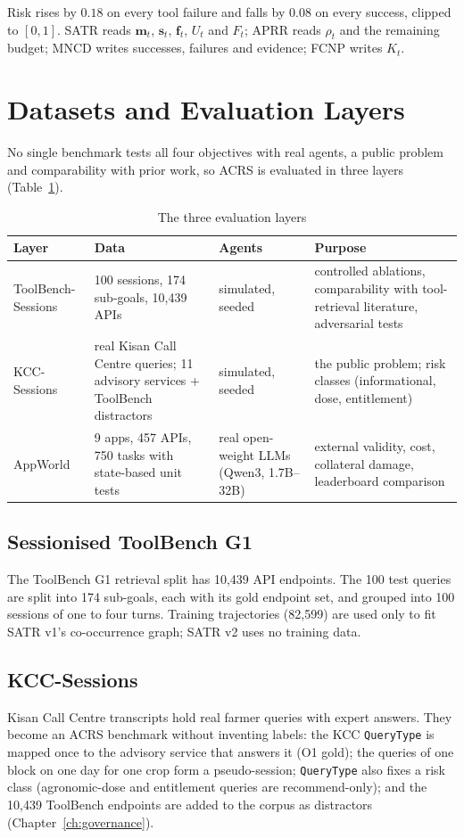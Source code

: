 Risk rises by $0.18$ on every tool failure and falls by $0.08$ on every success, clipped to $[0,1]$. SATR
reads $\mathbf{m}_t$, $\mathbf{s}_t$, $\mathbf{f}_t$, $U_t$ and $F_t$; APRR reads $\rho_t$ and the remaining
budget; MNCD writes successes, failures and evidence; FCNP writes $K_t$.

\section{Datasets and Evaluation Layers}
\label{sec:method-data}

No single benchmark tests all four objectives with real agents, a public problem and comparability with
prior work, so ACRS is evaluated in three layers (Table~\ref{tab:layers}).

\begin{table}[htbp]
\centering
\caption{The three evaluation layers}
\label{tab:layers}
\footnotesize
\begin{tabular}{@{}p{}p{}p{}p{}@{}}
\toprule
Layer & Data & Agents & Purpose \\
\midrule
ToolBench-Sessions & 100 sessions, 174 sub-goals, 10{,}439 APIs & simulated, seeded & controlled ablations, comparability with tool-retrieval literature, adversarial tests \\
KCC-Sessions & real Kisan Call Centre queries; 11 advisory services + ToolBench distractors & simulated, seeded & the public problem; risk classes (informational, dose, entitlement) \\
AppWorld & 9 apps, 457 APIs, 750 tasks with state-based unit tests & real open-weight LLMs (Qwen3, 1.7B--32B) & external validity, cost, collateral damage, leaderboard comparison \\
\bottomrule
\end{tabular}
\end{table}

\subsection{Sessionised ToolBench G1}
The ToolBench G1 retrieval split \citep{qin2024toolllm} has 10{,}439 API endpoints. The 100 test queries
are split into 174 sub-goals, each with its gold endpoint set, and grouped into 100 sessions of one to
four turns. Training trajectories (82{,}599) are used only to fit SATR v1's co-occurrence graph; SATR v2
uses no training data.

\subsection{KCC-Sessions}
Kisan Call Centre transcripts \citep{kccchakshu} hold real farmer queries with expert answers. They become
an ACRS benchmark without inventing labels: the KCC \texttt{QueryType} is mapped once to the advisory
service that answers it (O1 gold); the queries of one block on one day for one crop form a
pseudo-session; \texttt{QueryType} also fixes a risk class (agronomic-dose and entitlement queries are
recommend-only); and the 10{,}439 ToolBench endpoints are added to the corpus as distractors
(Chapter~\ref{ch:governance}).

